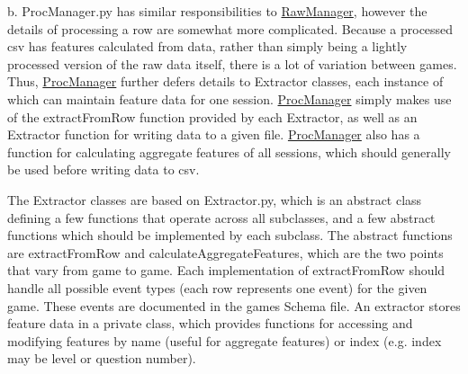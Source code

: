 \begin{DoxyEnumerate}
\item b. Proc\+Manager.\+py has similar responsibilities to \mbox{\hyperlink{class_raw_manager}{Raw\+Manager}}, however the details of processing a row are somewhat more complicated. Because a processed csv has features calculated from data, rather than simply being a lightly processed version of the raw data itself, there is a lot of variation between games. Thus, \mbox{\hyperlink{class_proc_manager}{Proc\+Manager}} further defers details to Extractor classes, each instance of which can maintain feature data for one session. \mbox{\hyperlink{class_proc_manager}{Proc\+Manager}} simply makes use of the {\ttfamily extract\+From\+Row} function provided by each Extractor, as well as an Extractor function for writing data to a given file. \mbox{\hyperlink{class_proc_manager}{Proc\+Manager}} also has a function for calculating aggregate features of all sessions, which should generally be used before writing data to csv.
\item The Extractor classes are based on Extractor.\+py, which is an abstract class defining a few functions that operate across all subclasses, and a few abstract functions which should be implemented by each subclass. The abstract functions are {\ttfamily extract\+From\+Row} and {\ttfamily calculate\+Aggregate\+Features}, which are the two points that vary from game to game. Each implementation of {\ttfamily extract\+From\+Row} should handle all possible event types (each row represents one event) for the given game. These events are documented in the game\textquotesingle{}s Schema file. An extractor stores feature data in a private class, which provides functions for accessing and modifying features by name (useful for aggregate features) or index (e.\+g. index may be level or question number).
\end{DoxyEnumerate}

